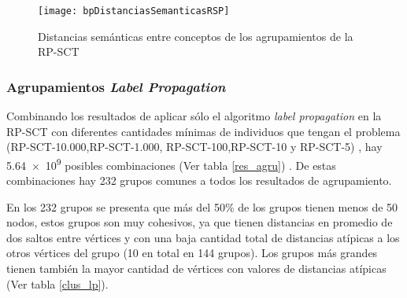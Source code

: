\begin{figure}[ht]
\caption{Distancias semánticas entre conceptos de los agrupamientos de la \acrshort{RP-SCT}}
\label{fig:bpDistanciasSemanticasRSP}
\centering
\texttt{[image: bpDistanciasSemanticasRSP]}
\end{figure}

\subsubsection{Agrupamientos \textit{Label Propagation}}
Combinando los resultados de aplicar sólo el algoritmo \textit{label propagation} en la \acrshort{RP-SCT} con diferentes cantidades mínimas de individuos que tengan el problema (RP-SCT-10.000,RP-SCT-1.000, RP-SCT-100,RP-SCT-10 y RP-SCT-5) , hay \num{5.64e9} posibles combinaciones (Ver tabla \ref{res_agru}) .  De estas combinaciones hay 232 grupos comunes a todos los resultados de agrupamiento. 

En los 232 grupos se presenta que más del 50\% de los grupos tienen menos de 50 nodos, estos grupos son muy cohesivos, ya que tienen distancias en promedio de dos saltos entre vértices y con una baja cantidad total de distancias atípicas a los otros vértices del grupo (10 en total en 144 grupos). Los grupos más grandes tienen también la mayor cantidad de vértices con valores de distancias atípicas (Ver tabla \ref{clus_lp}).

